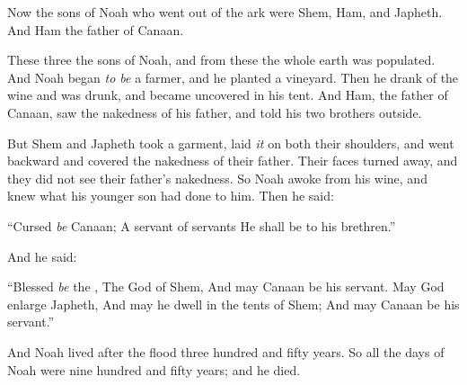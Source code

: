 
\bverse Now the sons of Noah who went out of the ark were Shem, Ham, and Japheth. And Ham \was the father of Canaan.

\bverse These three  the sons of Noah, and from these the whole earth was populated.
\bverse And Noah began \textit{to be} a farmer, and he planted a vineyard.
\bverse Then he drank of the wine and was drunk, and became uncovered in his tent.
\bverse And Ham, the father of Canaan, saw the nakedness of his father, and told his two brothers outside.

\bverse But Shem and Japheth took a garment, laid \textit{it} on both their shoulders, and went backward and covered the nakedness of their father. Their faces \were turned away, and they did not see their father's nakedness.
\bverse So Noah awoke from his wine, and knew what his younger son had done to him.
\bverse Then he said:
\begin{bquotation}
``Cursed \textit{be} Canaan; A servant of servants He shall be to his brethren.''
\end{bquotation}
\bverse And he said:
\begin{bquotation}
``Blessed \textit{be} the \lord, The God of Shem, And may Canaan be his servant.
\bverse May God enlarge Japheth, And may he dwell in the tents of Shem; And may Canaan be his servant.''
\end{bquotation}

\bverse And Noah lived after the flood three hundred and fifty years.
\bverse So all the days of Noah were nine hundred and fifty years; and he died.
